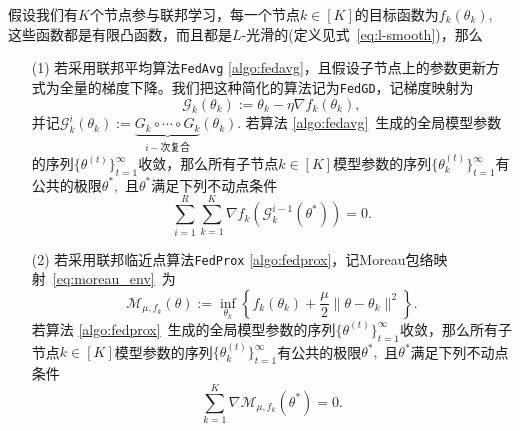 \begin{theorem}
\label{thm:fedsplit-correctness}
假设我们有$K$个节点参与联邦学习，每一个节点$k \in [K]$的目标函数为$f_k(\theta_k),$ 这些函数都是有限凸函数，而且都是$L$-光滑的(定义见式~\eqref{eq:l-smooth})，那么
\begin{itemize}
\item[(1)] 若采用联邦平均算法\texttt{FedAvg} \ref{algo:fedavg}，且假设子节点上的参数更新方式为全量的梯度下降。我们把这种简化的算法记为\texttt{FedGD}，记梯度映射为
\begin{equation}
\label{eq:grad-mapping}
\mathcal{G}_k (\theta_k) := \theta_k - \eta \nabla f_k (\theta_k),
\end{equation}
并记$\mathcal{G}^i_k (\theta_k) := \underbrace{G_k\circ\cdots\circ G_k}_{i-\text{次复合}} (\theta_k).$ 若算法 \ref{algo:fedavg}~生成的全局模型参数的序列$\{ \theta^{(t)} \}_{t=1}^{\infty}$收敛，那么所有子节点$k \in [K]$模型参数的序列$\{ \theta_k^{(t)} \}_{t=1}^{\infty}$有公共的极限$\theta^*,$ 且$\theta^*$满足下列不动点条件
\begin{equation}
\label{eq:fedgd-fixed-pt}
\sum\limits_{i=1}^R \sum\limits_{k=1}^K \nabla f_k(\mathcal{G}_k^{i-1}(\theta^*)) = 0.
\end{equation}
\item[(2)] 若采用联邦临近点算法\texttt{FedProx} \ref{algo:fedprox}，记Moreau包络映射~\eqref{eq:moreau_env}~为
\begin{equation}
\label{eq:moreau-mapping}
\mathcal{M}_{\mu, f_k} (\theta) := \inf\limits_{\theta_k} \left\{ f_k(\theta_k) + \frac{\mu}{2} \lVert \theta - \theta_k \rVert^2 \right\}.
\end{equation}
若算法 \ref{algo:fedprox}~生成的全局模型参数的序列$\{ \theta^{(t)} \}_{t=1}^{\infty}$收敛，那么所有子节点$k \in [K]$模型参数的序列$\{ \theta_k^{(t)} \}_{t=1}^{\infty}$有公共的极限$\theta^*,$ 且$\theta^*$满足下列不动点条件
\begin{equation}
\label{eq:fedprox-fixed-pt}
\sum\limits_{k=1}^K \nabla \mathcal{M}_{\mu, f_k} (\theta^*) = 0.
\end{equation}
\end{itemize}
\end{theorem}

